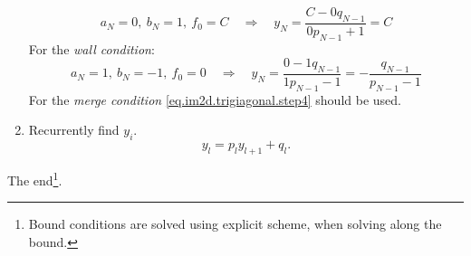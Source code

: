\documentclass[a4paper,10pt]{article}
\begin{document}
\begin{enumerate}
\begin{equation}
        a_N = 0,\ b_N = 1,\ f_0 = C
        \quad\Rightarrow\quad
        y_N = \frac{C - 0 q_{N-1}}{0 p_{N-1} + 1} = C
    \end{equation}
    For the \emph{wall condition}:
    \begin{equation}
        a_N = 1,\ b_N = -1,\ f_0 = 0
        \quad\Rightarrow\quad
        y_N = \frac{0 - 1 q_{N-1}}{1 p_{N-1} - 1} = -\frac{q_{N-1}}{p_{N-1} - 1}
    \end{equation}
    For the \emph{merge condition} \eqref{eq.im2d.trigiagonal.step4}
    should be used.
  \item Recurrently find $y_i$.
    \begin{equation}\label{eq.im2d.trigiagonal.step4}
        y_l = p_l y_{l+1} + q_l.
    \end{equation}
\end{enumerate}

The end\footnote{Bound conditions are solved using explicit scheme, when solving along the bound.}.







\end{document}

